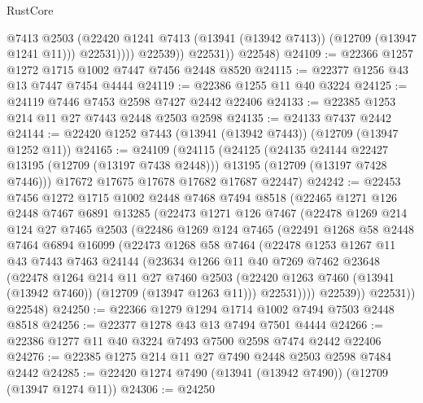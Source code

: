 \begin{lexlean}{RustCore}
\begin{coremodule}
                      @7413
                      @2503
                      (@22420 @1241 @7413 (@13941 (@13942 @7413)) (@12709 (@13947 @1241 @11)))
                      @22531))))
              @22539))
          @22531))
      @22548)
@24109 := @22366 @1257 @1272 @1715 @1002 @7447 @7456 @2448 @8520
@24115 := @22377 @1256 @43 @13 @7447 @7454 @4444
@24119 := @22386 @1255 @11 @40 @3224
@24125 := @24119 @7446 @7453 @2598 @7427 @2442 @22406
@24133 := @22385 @1253 @214 @11 @27 @7443 @2448 @2503 @2598
@24135 := @24133 @7437 @2442
@24144 := @22420 @1252 @7443 (@13941 (@13942 @7443)) (@12709 (@13947 @1252 @11))
@24165 := @24109
    (@24115
      (@24125
        (@24135 @24144 @22427 @13195 (@12709 (@13197 @7438 @2448)))
        @13195
        (@12709 (@13197 @7428 @7446)))
      @17672
      @17675
      @17678
      @17682
      @17687
      @22447)
@24242 := @22453
    @7456
    @1272
    @1715
    @1002
    @2448
    @7468
    @7494
    @8518
    (@22465
      @1271
      @126
      @2448
      @7467
      @6891
      @13285
      (@22473
        @1271
        @126
        @7467
        (@22478
          @1269
          @214
          @124
          @27
          @7465
          @2503
          (@22486
            @1269
            @124
            @7465
            (@22491
              @1268
              @58
              @2448
              @7464
              @6894
              @16099
              (@22473
                @1268
                @58
                @7464
                (@22478
                  @1253
                  @1267
                  @11
                  @43
                  @7443
                  @7463
                  @24144
                  (@23634
                    @1266
                    @11
                    @40
                    @7269
                    @7462
                    @23648
                    (@22478
                      @1264
                      @214
                      @11
                      @27
                      @7460
                      @2503
                      (@22420 @1263 @7460 (@13941 (@13942 @7460)) (@12709 (@13947 @1263 @11)))
                      @22531))))
              @22539))
          @22531))
      @22548)
@24250 := @22366 @1279 @1294 @1714 @1002 @7494 @7503 @2448 @8518
@24256 := @22377 @1278 @43 @13 @7494 @7501 @4444
@24266 := @22386 @1277 @11 @40 @3224 @7493 @7500 @2598 @7474 @2442 @22406
@24276 := @22385 @1275 @214 @11 @27 @7490 @2448 @2503 @2598 @7484 @2442
@24285 := @22420 @1274 @7490 (@13941 (@13942 @7490)) (@12709 (@13947 @1274 @11))
@24306 := @24250

\end{coremodule}
\end{lexlean}
